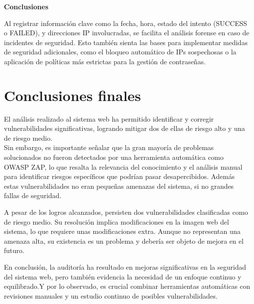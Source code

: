 \documentclass[a4paper,12pt]{article}
\begin{document}
\textbf{Conclusiones}

Al registrar información clave como la fecha, hora, estado del intento (SUCCESS o FAILED), y direcciones IP involucradas, se facilita el análisis forense en caso de incidentes de seguridad. Esto también sienta las bases para implementar medidas de seguridad adicionales, como el bloqueo automático de IPs sospechosas o la aplicación de políticas más estrictas para la gestión de contraseñas.
\section{Conclusiones finales}

El análisis realizado al sistema web ha permitido identificar y corregir vulnerabilidades significativas, logrando mitigar dos de ellas de riesgo alto y una de riesgo medio. \\

Sin embargo, es importante señalar que la gran mayoría de problemas solucionados no fueron detectados por una herramienta automática como OWASP ZAP, lo que resalta la relevancia del conocimiento y el análisis manual para identificar riesgos específicos que podrían pasar desapercibidos. Además estas vulnerabilidades no eran pequeñas amenazas del sistema, si no grandes fallas de seguridad.

A pesar de los logros alcanzados, persisten dos vulnerabilidades clasificadas como de riesgo medio. Su resolución implica modificaciones en la imagen web del sistema, lo que requiere unas modificaciones extra. Aunque no representan una amenaza alta, su existencia es un problema y debería ser objeto de mejora en el futuro.

En conclusión, la auditoría ha resultado en mejoras significativas en la seguridad del sistema web, pero también evidencia la necesidad de un enfoque continuo y equilibrado.Y por lo observado, es crucial combinar herramientas automáticas con revisiones manuales y un  estudio continuo de posibles vulnerabilidades.  

\newpage
\end{document}
